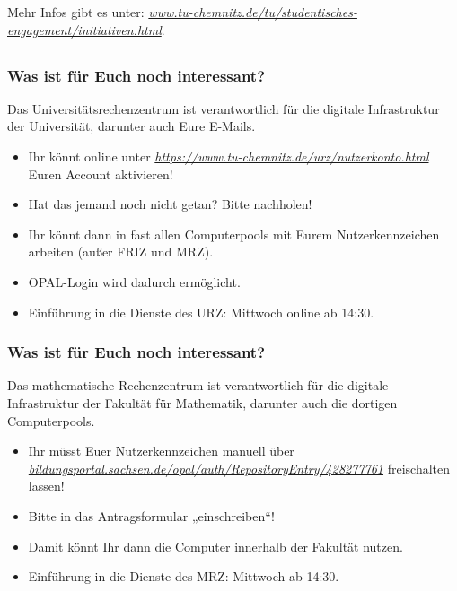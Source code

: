 \documentclass[10pt]{beamer}
\begin{document}
\begin{frame}
	\vspace*{3.8cm}

	Mehr Infos gibt es unter: \textit{\href{https://www.tu-chemnitz.de/tu/studentisches-engagement/initiativen.html}{www.tu-chemnitz.de/tu/studentisches-engagement/initiativen.html}}.
\end{frame}

\subsection*{ }

\begin{frame}
	\frametitle{Was ist für Euch noch interessant?}

	\begin{block}{\vphantom{X}}
		Das Universitätsrechenzentrum ist verantwortlich für die digitale Infrastruktur der Universität, darunter auch Eure E-Mails.
	\end{block}

	\begin{itemize}
		\item Ihr könnt online unter \textit{\href{https://www.tu-chemnitz.de/urz/nutzerkonto.html}{https://www.tu-chemnitz.de/urz/nutzerkonto.html}} Euren Account aktivieren!
		\item Hat das jemand noch nicht getan? Bitte nachholen!
		\item Ihr könnt dann in fast allen Computerpools mit Eurem Nutzerkennzeichen arbeiten (außer FRIZ und MRZ).
		\item OPAL-Login wird dadurch ermöglicht.
		\item Einführung in die Dienste des URZ: Mittwoch online ab 14:30.
	\end{itemize}
\end{frame}

\begin{frame}
	\frametitle{Was ist für Euch noch interessant?}

	\begin{block}{\vphantom{X}}
		Das mathematische Rechenzentrum ist verantwortlich für die digitale Infrastruktur der Fakultät für Mathematik, darunter auch die dortigen Computerpools.
	\end{block}

	\begin{itemize}
		\item Ihr müsst Euer Nutzerkennzeichen manuell über \textit{\href{https://bildungsportal.sachsen.de/opal/auth/RepositoryEntry/428277761}{bildungsportal.sachsen.de/opal/auth/RepositoryEntry/428277761}} freischalten lassen!
		\item Bitte in das Antragsformular „einschreiben“!
		\item Damit könnt Ihr dann die Computer innerhalb der Fakultät nutzen.
		\item Einführung in die Dienste des MRZ: Mittwoch ab 14:30.
	\end{itemize}
\end{frame}
\end{document}
